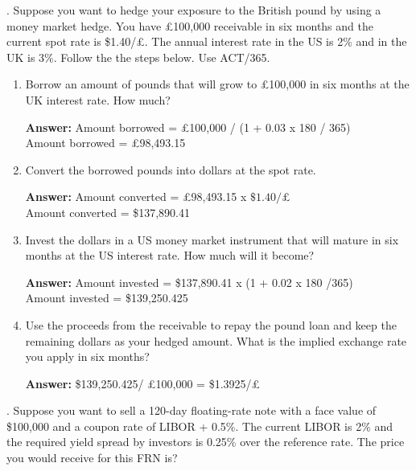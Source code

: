 \documentclass[11.5pt]{article}
\begin{document}
. Suppose you want to hedge your exposure to the British pound by using a money market hedge. You have £100,000 receivable in six months and the current spot rate is \$1.40/£. The annual interest rate in the US is 2\% and in the UK is 3\%. Follow the the steps below. Use ACT/365.

\begin{enumerate}[A]
\item Borrow an amount of pounds that will grow to £100,000 in six months at the UK interest rate. How much?

\vspace{20pt}
\textbf{Answer:} 
Amount borrowed = £100,000 / (1 + 0.03 x 180 / 365) \\
Amount borrowed = £98,493.15

\item Convert the borrowed pounds into dollars at the spot rate.

\vspace{20pt}
\textbf{Answer:}
Amount converted = £98,493.15 x $\$1.40/\text{£}$\\
Amount converted = \$137,890.41

\item Invest the dollars in a US money market instrument that will mature in six months at the US interest rate. How much will it become?

\vspace{20pt}
\textbf{Answer:}
Amount invested = \$137,890.41 x (1 + 0.02 x 180 /365)\\
Amount invested = \$139,250.425


\item Use the proceeds from the receivable to repay the pound loan and keep the remaining dollars as your hedged amount. What is the implied exchange rate you apply in six months?

\vspace{20pt}
\textbf{Answer:} \$139,250.425/ £100,000 = \$1.3925/£



\end{enumerate}



\vspace{50pt}



. Suppose you want to sell a 120-day floating-rate note with a face value of \$100,000 and a coupon rate of LIBOR + 0.5\%. The current LIBOR is 2\% and the required yield spread by investors is 0.25\% over the reference rate. The price you would receive for this FRN is?
\end{document}

